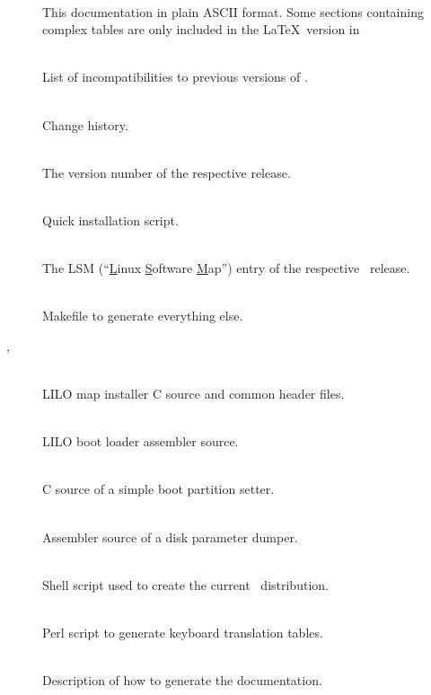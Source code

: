\begin{description}
  \item[]~\\
    This documentation in plain ASCII format. Some sections containing
    complex tables are only included in the \LaTeX\ version in
  \item[]~\\
    List of incompatibilities to previous versions of \LILO.
  \item[]~\\
    Change history.
  \item[]~\\
    The version number of the respective release.
  \item[]~\\
    Quick installation script.
  \item[]~\\
    The LSM (``\underline{L}inux \underline{S}oftware \underline{M}ap'') entry
    of the respective \LILO\ release.
  \item[]~\\
    Makefile to generate everything else.
  \item[, ]~\\
    LILO map installer C source and common header files.
  \item[]~\\
    LILO boot loader assembler source.
  \item[]~\\
    C source of a simple boot partition setter.
  \item[]~\\
    Assembler source of a disk parameter dumper.
  \item[]~\\
    Shell script used to create the current \LILO\ distribution.
  \item[]~\\
    Perl script to generate keyboard translation tables.
  \item[]~\\
    Description of how to generate the documentation.
  \item[]~\\

\end{description}
